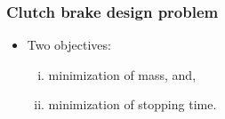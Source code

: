\documentclass[svgnames, table, smaller]{beamer}
\begin{document}
\begin{frame}[allowframebreaks]
  \frametitle{Clutch brake design problem}

  \begin{itemize}
  \item Two objectives:
    \begin{enumerate}[(i)]
    \item minimization of mass, and,
    \item minimization of stopping time.
    \end{enumerate}
  \end{itemize}


  \begin{figure}[ht]\begin{center}
      \label{clutchbrake}
    \end{center}
  \end{figure}
  
    

\end{frame}
\end{document}
